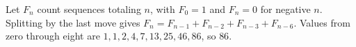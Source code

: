 Let $F_n$ count sequences totaling $n$, with $F_0=1$ and $F_n=0$ for negative $n$. Splitting by the last move gives $F_n=F_{n-1}+F_{n-2}+F_{n-3}+F_{n-6}$. Values from zero through eight are $1,1,2,4,7,13,25,46,86$, so $\boxed{86}$.
